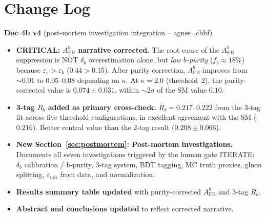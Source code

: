 \documentclass[11pt,a4paper]{article}
\begin{document}
\tableofcontents
\clearpage

\section*{Change Log}

\textbf{Doc 4b v4} (post-mortem investigation integration -- agnes\_cbbf)
\begin{itemize}
\item \textbf{CRITICAL: $A_\mathrm{FB}^b$ narrative corrected.} The root cause of the
  $A_\mathrm{FB}^b$ suppression is NOT $\delta_b$ overestimation alone, but \emph{low $b$-purity}
  ($f_b \approx 18\%$) because $\varepsilon_c > \varepsilon_b$ ($0.44 > 0.15$). After purity
  correction, $A_\mathrm{FB}^b$ improves from $\sim 0.01$ to $0.05$--$0.08$ depending on $\kappa$.
  At $\kappa = 2.0$ (threshold~2), the purity-corrected value is $0.074 \pm 0.031$, within
  $\sim 2\sigma$ of the SM value $0.10$.
\item \textbf{3-tag $R_b$ added as primary cross-check.} $R_b = 0.217$--$0.222$ from the
  3-tag fit across five threshold configurations, in excellent agreement with
  the SM ($0.216$). Better central value than the 2-tag result ($0.208 \pm 0.066$).
\item \textbf{New Section~\ref{sec:postmortem}: Post-mortem investigations.} Documents all
  seven investigations triggered by the human gate ITERATE: $\delta_b$ calibration /
  b-purity, 3-tag system, BDT tagging, MC truth proxies, gluon splitting,
  $\varepsilon_\mathrm{uds}$ from data, and normalization.
\item \textbf{Results summary table updated} with purity-corrected $A_\mathrm{FB}^b$ and
  3-tag $R_b$.
\item \textbf{Abstract and conclusions updated} to reflect corrected narrative.
\end{itemize}
\end{document}
